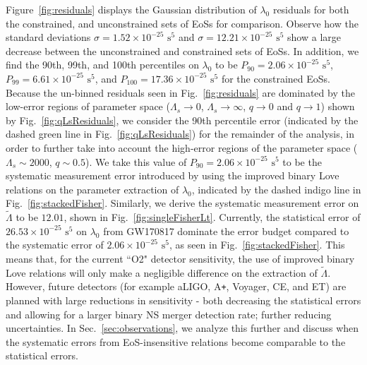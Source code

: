 \documentclass[prd,twocolumn,nofootinbib,superscriptaddress,amsmath,amssymb]{revtex4-1}
\begin{document}
Figure~\ref{fig:residuals} displays the Gaussian distribution of $\lambda_0$ residuals for both the constrained, and unconstrained sets of EoSs for comparison.
Observe how the standard deviations $\sigma=1.52\times10^{-25} \text{ s}^5$ and $\sigma=12.21\times10^{-25} \text{ s}^5$ show a large decrease between the unconstrained and constrained sets of EoSs.
In addition, we find the 90th, 99th, and 100th percentiles on $\lambda_0$ to be $P_{90}=2.06\times10^{-25} \text{ s}^5$, $P_{99}=6.61\times10^{-25} \text{ s}^5$, and $P_{100}=17.36\times10^{-25} \text{ s}^5$ for the constrained EoSs.
Because the un-binned residuals seen in Fig.~\ref{fig:residuals} are dominated by the low-error regions of parameter space ($\Lambda_s \rightarrow 0$, $\Lambda_s \rightarrow \infty$, $q \rightarrow 0$ and $q \rightarrow 1$) shown by Fig.~\ref{fig:qLsResiduals}, we consider the 90th percentile error (indicated by the dashed green line in Fig.~\ref{fig:qLsResiduals}) for the remainder of the analysis, in order to further take into account the high-error regions of the parameter space ($\Lambda_s \sim 2000$, $q\sim0.5$).
We take this value of $P_{90}=2.06\times10^{-25} \text{ s}^5$ to be the systematic measurement error introduced by using the improved binary Love relations on the parameter extraction of $\lambda_0$, indicated by the dashed indigo line in Fig.~\ref{fig:stackedFisher}.
Similarly, we derive the systematic measurement error on $\tilde\Lambda$ to be $12.01$, shown in Fig.~\ref{fig:singleFisherLt}.
Currently, the statistical error of $26.53 \times 10^{-25} \text{ s}^5$ on $\lambda_0$ from GW170817 dominate the error budget compared to the systematic error of $2.06\times10^{-25} \text{ s}^5$, as seen in Fig.~\ref{fig:stackedFisher}.
This means that, for the current ``O2" detector sensitivity, the use of improved binary Love relations will only make a negligible difference on the extraction of $\tilde\Lambda$.
However, future detectors (for example aLIGO, A\texttt{+}, Voyager, CE, and ET) are planned with large reductions in sensitivity - both decreasing the statistical errors and allowing for a larger binary NS merger detection rate; further reducing uncertainties.
In Sec.~\ref{sec:observations}, we analyze this further and discuss when the systematic errors from EoS-insensitive relations become comparable to the statistical errors.
\end{document}
